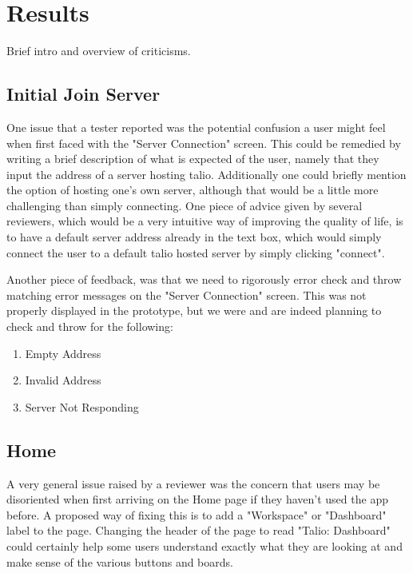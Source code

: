 \section{Results}

Brief intro and overview of criticisms.

\subsection{Initial Join Server}

    One issue that a tester reported was the potential confusion a user might feel when first faced with the "Server Connection" screen. This could be remedied by writing a brief description of what is expected of the user, namely that they input the address of a server hosting talio. Additionally one could briefly mention the option of hosting one's own server, although that would be a little more challenging than simply connecting. One piece of advice given by several reviewers, which would be a very intuitive way of improving the quality of life, is to have a default server address already in the text box, which would simply connect the user to a default talio hosted server by simply clicking "connect".

    Another piece of feedback, was that we need to rigorously error check and throw matching error messages on the "Server Connection" screen. This was not properly displayed in the prototype, but we were and are indeed planning to check and throw for the following:
\begin{enumerate}
    \item Empty Address
    \item Invalid Address
    \item Server Not Responding
\end{enumerate}

\subsection{Home}

    A very general issue raised by a reviewer was the concern that users may be disoriented when first arriving on the Home page if they haven't used the app before. A proposed way of fixing this is to add a "Workspace" or "Dashboard" label to the page. Changing the header of the page to read "Talio: Dashboard" could certainly help some users understand exactly what they are looking at and make sense of the various buttons and boards.

